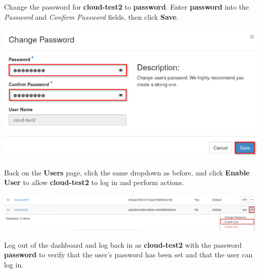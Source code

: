 \documentclass[letterpaper, 12pt]{article}
\begin{document}
\begin{enumerate}
    \begin{labstep}
        Change the password for \textbf{cloud-test2} to \textbf{password}.
        Enter \textbf{password} into the
        \textit{Password} and \textit{Confirm Password} fields, then click \textbf{Save}.

        \begin{center}
            \includegraphics[width=\linewidth]{images/part3/step16.png}
        \end{center}
    \end{labstep}

    \begin{labstep}
        Back on the \textbf{Users} page, click the same dropdown as before, and click \textbf{Enable User} to allow \textbf{cloud-test2} to log in and perform actions.

        \begin{center}
            \includegraphics[width=\linewidth]{images/part3/step17.png}
        \end{center}
    \end{labstep}

    \begin{labstep}
        Log out of the dashboard and log back in as \textbf{cloud-test2} with the password \textbf{password} to verify that the user's password has been set and that the user can log in.


\end{labstep}
\end{enumerate}
\end{document}
